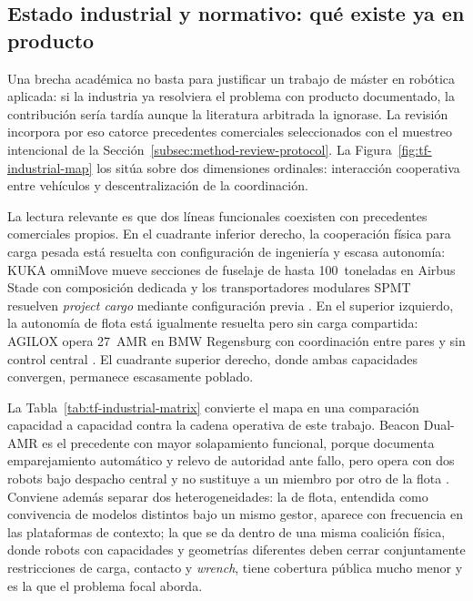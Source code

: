 \subsection{Estado industrial y normativo: qué existe ya en producto}
\label{subsec:tf-industrial}

Una brecha académica no basta para justificar un trabajo de máster en robótica
aplicada: si la industria ya resolviera el problema con producto documentado, la
contribución sería tardía aunque la literatura arbitrada la ignorase. La revisión
incorpora por eso catorce precedentes comerciales seleccionados con el muestreo
intencional de la Sección~\ref{subsec:method-review-protocol}. La
Figura~\ref{fig:tf-industrial-map} los sitúa sobre dos dimensiones ordinales:
interacción cooperativa entre vehículos y descentralización de la coordinación.



La lectura relevante es que dos líneas funcionales coexisten con precedentes
comerciales propios. En el cuadrante inferior derecho, la cooperación física para carga
pesada está resuelta con configuración de ingeniería y escasa autonomía: KUKA omniMove
mueve secciones de fuselaje de hasta 100~toneladas en Airbus Stade con composición
dedicada \parencite{kukaOmnimoveAirbus2016} y los transportadores modulares SPMT
resuelven \emph{project cargo} mediante configuración previa
\parencite{tiiScheuerleSpmt2023}. En el superior izquierdo, la autonomía de flota está
igualmente resuelta pero sin carga compartida: AGILOX opera 27~AMR en BMW Regensburg con
coordinación entre pares y sin control central \parencite{agiloxXswarmBmw2023}. El
cuadrante superior derecho, donde ambas capacidades convergen, permanece escasamente
poblado.



La Tabla~\ref{tab:tf-industrial-matrix} convierte el mapa en una comparación capacidad a
capacidad contra la cadena operativa de este trabajo. Beacon Dual-AMR es el precedente
con mayor solapamiento funcional, porque documenta emparejamiento automático y relevo de
autoridad ante fallo, pero opera con dos robots bajo despacho central y no sustituye a
un miembro por otro de la flota \parencite{beaconDualAmr2026}. Conviene además separar
dos heterogeneidades: la de flota, entendida como convivencia de modelos distintos bajo
un mismo gestor, aparece con frecuencia en las plataformas de contexto; la que se da
dentro de una misma coalición física, donde robots con capacidades y geometrías
diferentes deben cerrar conjuntamente restricciones de carga, contacto y \emph{wrench},
tiene cobertura pública mucho menor y es la que el problema focal aborda.


